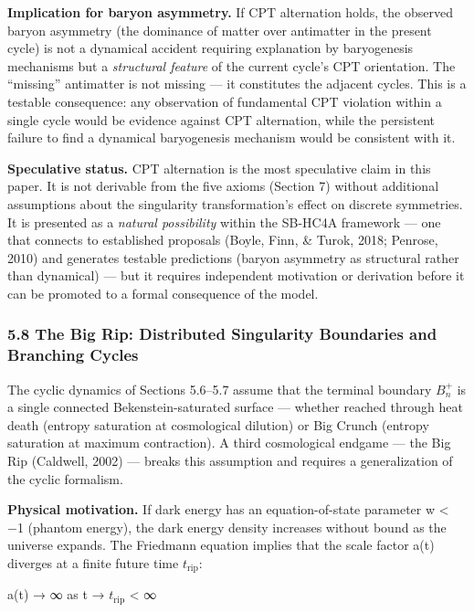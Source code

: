 \documentclass[
]{article}
\begin{document}
\textbf{Implication for baryon asymmetry.} If CPT alternation holds, the
observed baryon asymmetry (the dominance of matter over antimatter in
the present cycle) is not a dynamical accident requiring explanation by
baryogenesis mechanisms but a \emph{structural feature} of the current
cycle's CPT orientation. The ``missing'' antimatter is not missing ---
it constitutes the adjacent cycles. This is a testable consequence: any
observation of fundamental CPT violation within a single cycle would be
evidence against CPT alternation, while the persistent failure to find a
dynamical baryogenesis mechanism would be consistent with it.

\textbf{Speculative status.} CPT alternation is the most speculative
claim in this paper. It is not derivable from the five axioms (Section
7) without additional assumptions about the singularity transformation's
effect on discrete symmetries. It is presented as a \emph{natural
possibility} within the SB-HC4A framework --- one that connects to
established proposals (Boyle, Finn, \& Turok, 2018; Penrose, 2010) and
generates testable predictions (baryon asymmetry as structural rather
than dynamical) --- but it requires independent motivation or derivation
before it can be promoted to a formal consequence of the model.

\hypertarget{the-big-rip-distributed-singularity-boundaries-and-branching-cycles}{%
\subsubsection{5.8 The Big Rip: Distributed Singularity Boundaries and
Branching
Cycles}\label{the-big-rip-distributed-singularity-boundaries-and-branching-cycles}}

The cyclic dynamics of Sections 5.6--5.7 assume that the terminal
boundary \(B_n^+\) is a single connected Bekenstein-saturated surface
--- whether reached through heat death (entropy saturation at
cosmological dilution) or Big Crunch (entropy saturation at maximum
contraction). A third cosmological endgame --- the Big Rip (Caldwell,
2002) --- breaks this assumption and requires a generalization of the
cyclic formalism.

\textbf{Physical motivation.} If dark energy has an equation-of-state
parameter w \textless{} −1 (phantom energy), the dark energy density
increases without bound as the universe expands. The Friedmann equation
implies that the scale factor a(t) diverges at a finite future time
\(t_{\mathrm{rip}}\):

a(t) → ∞ as t → \(t_{\mathrm{rip}}\) \textless{} ∞
\end{document}
